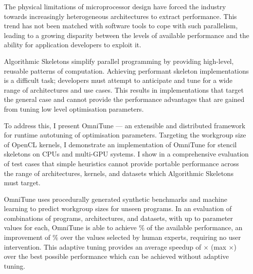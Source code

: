The physical limitations of microprocessor design have forced the
industry towards increasingly heterogeneous architectures to extract
performance. This trend has not been matched with software tools to
cope with such parallelism, leading to a growing disparity between the
levels of available performance and the ability for application
developers to exploit it.

Algorithmic Skeletons simplify parallel programming by providing
high-level, reusable patterns of computation. Achieving performant
skeleton implementations is a difficult task; developers must attempt
to anticipate and tune for a wide range of architectures and use
cases. This results in implementations that target the general case
and cannot provide the performance advantages that are gained from
tuning low level optimisation parameters.

To address this, I present OmniTune --- an extensible and distributed
framework for runtime autotuning of optimisation parameters. Targeting
the workgroup size of OpenCL kernels, I demonstrate an implementation
of OmniTune for stencil skeletons on CPUs and multi-GPU systems. I
show in a comprehensive evaluation of 
test cases that simple heuristics cannot provide portable performance
across the range of architectures, kernels, and datasets which
Algorithmic Skeletons must target.


OmniTune uses procedurally generated synthetic benchmarks and machine
learning to predict workgroup sizes for unseen programs. In an
evaluation of  combinations of programs,
architectures, and datasets, with up to 
parameter values for each, OmniTune is able to achieve
$\%$ of the available
performance, an improvement of
$\%$ over the
values selected by human experts, requiring no user intervention. This
adaptive tuning provides an average speedup of
$\times$ (max
$\times$) over the best
possible performance which can be achieved without adaptive tuning.

